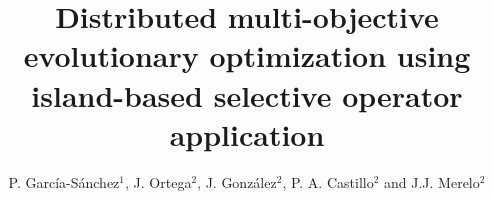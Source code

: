 \documentclass[preprint]{elsarticle}
\newenvironment{bluecolor}{\par\color{blue}}{\par}
\begin{document}
\begin{frontmatter}

\title{Distributed multi-objective evolutionary optimization using island-based selective operator application}


\author{P. Garc\'ia-S\'anchez$^1$, J. Ortega$^2$, J. Gonz\'alez$^2$, P. A. Castillo$^2$ and J.J. Merelo$^2$}
\address{
$^1$ Department of Computer Science and Engineering. ESI. University of C\'adiz, Spain\\
$^2$ Department of Computer Architecture and Computer Technology.\\ ETSIIT - CITIC. University of Granada, Spain\\
}


\begin{abstract}





\begin{bluecolor}


\end{bluecolor}
\end{abstract}
\end{frontmatter}
\end{document}
